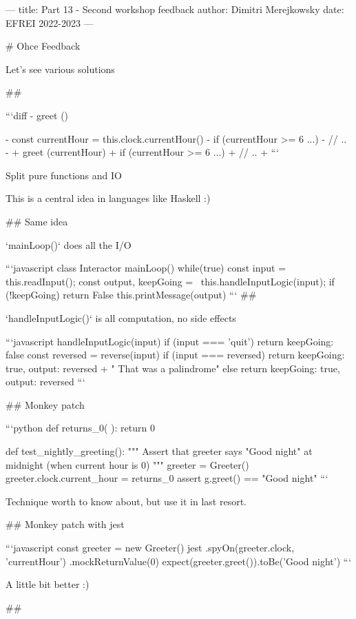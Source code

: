 ---
title: Part 13 - Second workshop feedback
author: Dimitri Merejkowsky
date: EFREI 2022-2023
---

# Ohce Feedback

Let's see various solutions

##

```diff
-  greet () {
-    const currentHour = this.clock.currentHour()
-    if (currentHour >= 6 ...) {
-    // ..
-  }
+  greet (currentHour)
+    if (currentHour >= 6 ...) {
+    // ..
+  }
```

Split pure functions and IO

This is a central idea in languages like Haskell :)

## Same idea

`mainLoop()` does all the I/O

```javascript
class Interactor
  mainLoop() {
   while(true) {
     const input = this.readInput();
     const { output, keepGoing } = \
       this.handleInputLogic(input);
     if (!keepGoing) {
        return False
     }
     this.printMessage(output)
  }
}
```
##

`handleInputLogic()` is all computation, no side effects

```javascript
handleInputLogic(input) {
  if (input === 'quit') {
    return { keepGoing: false }
  }
  const reversed = reverse(input)
  if (input === reversed) {
    return {
      keepGoing: true,
      output: reversed + " That was a palindrome"
    }
  }
  else {
    return {
      keepGoing: true,
      output: reversed
    }
  }
}
```

## Monkey patch

```python
def returns_0( ):
    return 0

def test_nightly_greeting():
    """
    Assert that greeter says "Good night" at midnight
    (when current hour is 0)
    """
    greeter = Greeter()
    greeter.clock.current_hour = returns_0
    assert g.greet() == "Good night"
```

\vfill

Technique worth to know about, but use it in last resort.

## Monkey patch with jest

```javascript
const greeter = new Greeter()
jest
  .spyOn(greeter.clock, 'currentHour')
  .mockReturnValue(0)
expect(greeter.greet()).toBe('Good night')
```

\vfill

A little bit better :)

##

}
